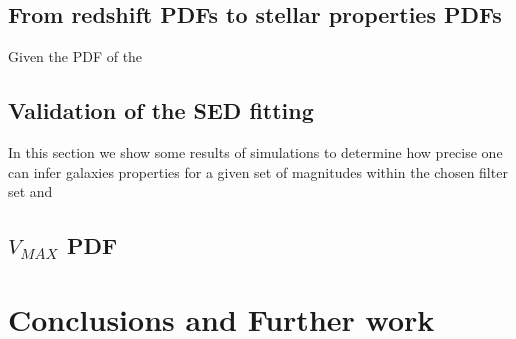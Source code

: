 \documentclass[9pt]{memoir}
\begin{document}
\section{From redshift PDFs to stellar properties PDFs}
\label{sec:fit}

Given the PDF of the 

\section{Validation of the SED fitting}

In this section we show some results of simulations to determine how precise one can infer galaxies properties for a given set of magnitudes within the chosen filter set and 

\section{$V_{MAX}$ PDF}
\label{sec:vmax}



\chapter{Conclusions and Further work}




\end{document}
